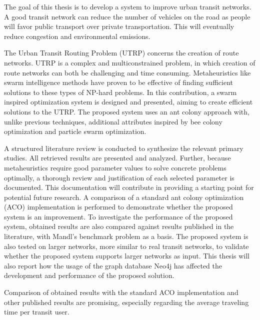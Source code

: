 

The goal of this thesis is to develop a system to improve urban transit networks. A good transit network can reduce the number of vehicles on the road as people will favor public transport over private transportation. This will eventually reduce congestion and environmental emissions.%

The Urban Transit Routing Problem (UTRP) concerns the creation of route networks. UTRP is a complex and multiconstrained problem, in which creation of route networks can both be challenging and time consuming. Metaheuristics like swarm intelligence methods have proven to be effective of finding sufficient solutions to these types of NP-hard problems. In this contribution, a swarm inspired optimization system is designed and presented, aiming to create efficient solutions to the UTRP. The proposed system uses an ant colony approach with, unlike previous techniques, additional attributes inspired by bee colony optimization and particle swarm optimization. 

A structured literature review is conducted to synthesize the relevant primary studies. All retrieved results are presented and analyzed. Further, because metaheuristics require good parameter values to solve concrete problems optimally, a thorough review and justification of each selected parameter is documented. This documentation will contribute in providing a starting point for potential future research. A comparison of a standard ant colony optimization (ACO) implementation is performed to demonstrate whether the proposed system is an improvement. To investigate the performance of the proposed system, obtained results are also compared against results published in the literature, with Mandl's benchmark problem as a basis.  The proposed system is also tested on larger networks, more similar to real transit networks, to validate whether the proposed system supports larger networks as input. This thesis will also report how the usage of the graph database Neo4j has affected the development and performance of the proposed solution.  

Comparison of obtained results with the standard ACO implementation and other published results are promising, especially regarding the average traveling time per transit user. 



